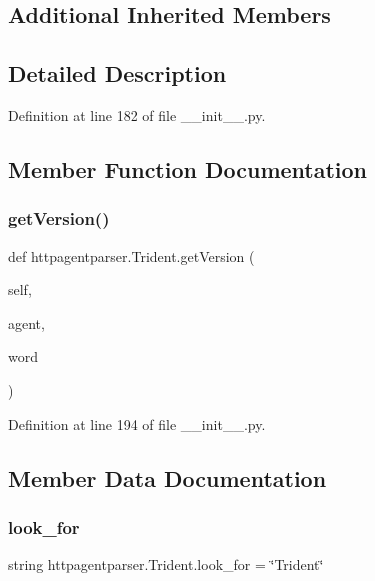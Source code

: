 \subsection*{Additional Inherited Members}


\subsection{Detailed Description}


Definition at line 182 of file \+\_\+\+\_\+init\+\_\+\+\_\+.\+py.



\subsection{Member Function Documentation}
\hypertarget{classhttpagentparser_1_1_trident_a6ff39e555868bd4b20fb42f7ceaac274}{}\label{classhttpagentparser_1_1_trident_a6ff39e555868bd4b20fb42f7ceaac274} 
\subsubsection{\texorpdfstring{get\+Version()}{getVersion()}}
{\footnotesize\ttfamily def httpagentparser.\+Trident.\+get\+Version (\begin{DoxyParamCaption}\item[{}]{self,  }\item[{}]{agent,  }\item[{}]{word }\end{DoxyParamCaption})}



Definition at line 194 of file \+\_\+\+\_\+init\+\_\+\+\_\+.\+py.



\subsection{Member Data Documentation}
\hypertarget{classhttpagentparser_1_1_trident_a54ad9658e6723b62803de10a1f00927d}{}\label{classhttpagentparser_1_1_trident_a54ad9658e6723b62803de10a1f00927d} 
\subsubsection{\texorpdfstring{look\+\_\+for}{look\_for}}
{\footnotesize\ttfamily string httpagentparser.\+Trident.\+look\+\_\+for = \char`\"{}Trident\char`\"{}\hspace{0.3cm}{\ttfamily [static]}}




